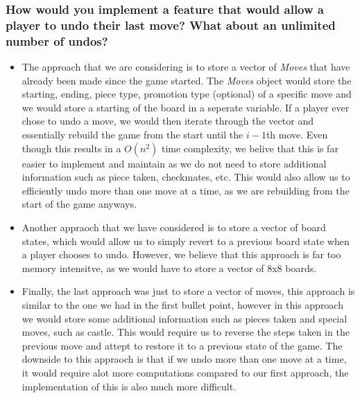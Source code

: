\documentclass{article}
\begin{document}
\subsubsection*{How would you implement a feature that would allow a player to undo their last move? What about an unlimited number of undos?}
\begin{itemize}
    \item The approach that we are considering is to store a vector of \textit{Moves}
that have already been made since the game started. The \textit{Moves} object would store the starting, ending, piece type, promotion type (optional)
    of a specific move and we would store a starting of the board in a seperate variable. If a player ever chose to undo a move, we would then iterate through the vector and essentially rebuild the game from the start 
    until the $i-1$th move. Even though this results in a $O(n^2)$ time complexity, we belive that this is far easier to implement and maintain as we do not need to store additional information such as 
    piece taken, checkmates, etc. This would also allow us to efficiently undo more than one move at a time, as we are rebuilding from the start of the game anyways.
    \item Another appraoch that we have considered is to store a vector of board states, which would allow us to simply revert to a previous board state when a player chooses to undo. However,
    we believe that this approach is far too memory intensitve, as we would have to store a vector of 8x8 boards.
    \item Finally, the last approach was just to store a vector of moves, this approach is similar to the one we had in the first bullet point, however in this approach we would store some additional information such as 
    pieces taken and special moves, such as castle. This would require us to reverse the steps taken in the previous move and attept to restore it to a previous state of the game. The downside to this appraoch is that
    if we undo more than one move at a time, it would require alot more computations compared to our first approach, the implementation of this is also much more difficult.
\end{itemize}
\end{document}
